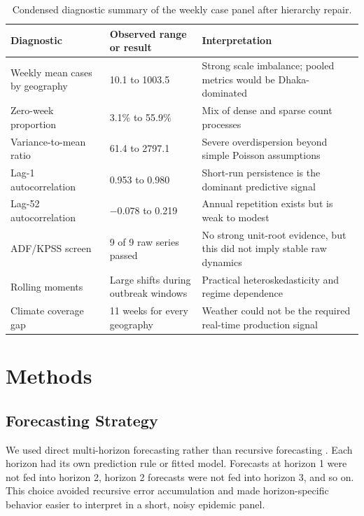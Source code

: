 \documentclass[11pt]{article}
\begin{document}
\begin{table}[H]
\centering
\small
\caption{Condensed diagnostic summary of the weekly case panel after hierarchy repair.}
\label{tab:eda-summary}
\begin{tabular}{@{}p{}p{}p{}@{}}
\toprule
Diagnostic & Observed range or result & Interpretation \\
\midrule
Weekly mean cases by geography & 10.1 to 1003.5 & Strong scale imbalance; pooled metrics would be Dhaka-dominated \\
Zero-week proportion & 3.1\% to 55.9\% & Mix of dense and sparse count processes \\
Variance-to-mean ratio & 61.4 to 2797.1 & Severe overdispersion beyond simple Poisson assumptions \\
Lag-1 autocorrelation & 0.953 to 0.980 & Short-run persistence is the dominant predictive signal \\
Lag-52 autocorrelation & $-0.078$ to 0.219 & Annual repetition exists but is weak to modest \\
ADF/KPSS screen & 9 of 9 raw series passed & No strong unit-root evidence, but this did not imply stable raw dynamics \\
Rolling moments & Large shifts during outbreak windows & Practical heteroskedasticity and regime dependence \\
Climate coverage gap & 11 weeks for every geography & Weather could not be the required real-time production signal \\
\bottomrule
\end{tabular}
\end{table}

\section{Methods}
\subsection{Forecasting Strategy}
We used direct multi-horizon forecasting rather than recursive forecasting \citep{hyndman2021forecasting}. Each horizon had its own prediction rule or fitted model. Forecasts at horizon 1 were not fed into horizon 2, horizon 2 forecasts were not fed into horizon 3, and so on. This choice avoided recursive error accumulation and made horizon-specific behavior easier to interpret in a short, noisy epidemic panel.
\end{document}
